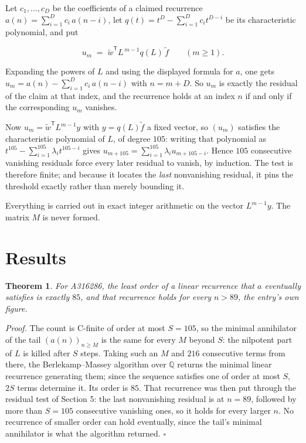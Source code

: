 \documentclass[11pt]{article}
\newtheorem{theorem}{Theorem}
\theoremstyle{definition}
\begin{document}
Let $c_1,\dots,c_D$ be the coefficients of a claimed recurrence $a(n) = \sum_{i=1}^{D} c_i\,a(n-i)$, let $q(t) = t^{D} - \sum_{i=1}^{D} c_i t^{D-i}$ be its characteristic polynomial, and put

\[u_m \;=\; \tilde w^{\mathsf T} L^{\,m-1} q(L)\,\tilde f \qquad (m \ge 1).\]

Expanding the powers of $L$ and using the displayed formula for $a$, one gets $u_m = a(n) - \sum_{i=1}^{D} c_i\,a(n-i)$ with $n = m + D$. So $u_m$ is exactly the residual of the claim at that index, and the recurrence holds at an index $n$ if and only if the corresponding $u_m$ vanishes.

Now $u_m = \tilde w^{\mathsf T} L^{m-1} y$ with $y = q(L)\tilde f$ a fixed vector, so $(u_m)$ satisfies the characteristic polynomial of $L$, of degree $105$: writing that polynomial as $t^{105} - \sum_{i=1}^{105} \lambda_i t^{105-i}$ gives $u_{m+105} = \sum_{i=1}^{105} \lambda_i u_{m+105-i}$. Hence $105$ consecutive vanishing residuals force every later residual to vanish, by induction. The test is therefore finite; and because it locates the {\itshape last} nonvanishing residual, it pins the threshold exactly rather than merely bounding it.

Everything is carried out in exact integer arithmetic on the vector $L^{m-1}y$. The matrix $M$ is never formed.

\section{Results}

\begin{theorem} For A316286, the least order of a linear recurrence that $a$ eventually satisfies is exactly $85$, and that recurrence holds for every $n > 89$, the entry's own figure.\end{theorem}

{\itshape Proof.} The count is C-finite of order at most $S = 105$, so the minimal annihilator of the tail $(a(n))_{n \ge M}$ is the same for every $M$ beyond $S$: the nilpotent part of $L$ is killed after $S$ steps. Taking such an $M$ and $216$ consecutive terms from there, the Berlekamp--Massey algorithm over $\mathbb{Q}$ returns the minimal linear recurrence generating them; since the sequence satisfies one of order at most $S$, $2S$ terms determine it. Its order is $85$. That recurrence was then put through the residual test of Section 5: the last nonvanishing residual is at $n = 89$, followed by more than $S = 105$ consecutive vanishing ones, so it holds for every larger $n$. No recurrence of smaller order can hold eventually, since the tail's minimal annihilator is what the algorithm returned. $\square$
\end{document}
